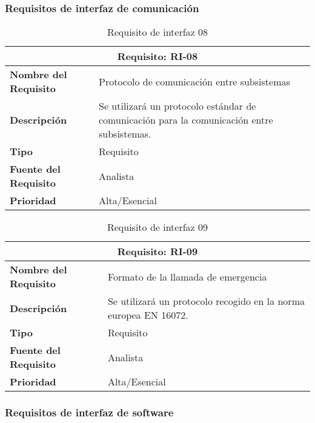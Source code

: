 \subsubsection{Requisitos de interfaz de comunicación}

\begin{table}[H]
\begin{center}
\begin{tabular}{p{} p{7cm}}
\multicolumn{2}{c}{\textbf{Requisito: RI-08} } \\
\hline \hline
\textbf{Nombre del Requisito} & Protocolo de comunicación entre subsistemas\\
\hline
\textbf{Descripción} & Se utilizará un protocolo estándar de comunicación para la comunicación entre subsistemas. \\
\hline
\textbf{Tipo} & Requisito  \\
\hline
\textbf{Fuente del Requisito} & Analista \\
\hline
\textbf{Prioridad} & Alta/Esencial  \\ \hline
\end{tabular}
\caption{Requisito de interfaz 08}
\label{tab:RI-08}
\end{center}
\end{table}

\begin{table}[H]
\begin{center}
\begin{tabular}{p{} p{7cm}}
\multicolumn{2}{c}{\textbf{Requisito: RI-09} } \\
\hline \hline
\textbf{Nombre del Requisito} & Formato de la llamada de emergencia\\
\hline
\textbf{Descripción} & Se utilizará un protocolo recogido en la norma europea EN 16072. \\
\hline
\textbf{Tipo} & Requisito  \\
\hline
\textbf{Fuente del Requisito} & Analista \\
\hline
\textbf{Prioridad} & Alta/Esencial  \\ \hline
\end{tabular}
\caption{Requisito de interfaz 09}
\label{tab:RI-09}
\end{center}
\end{table}

\subsubsection{Requisitos de interfaz de software}

